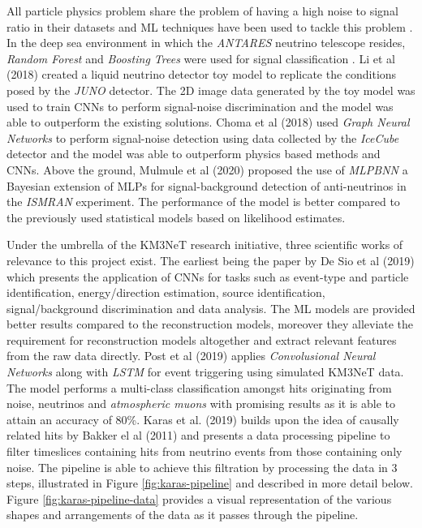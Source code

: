 All particle physics problem share the problem of having a high noise
to signal ratio in their datasets and ML techniques have been used to
tackle this problem \cite{mulmule2020machine, li2018deep,
  choma2018graph, neff2012signal}. In the deep sea environment in
which the \emph{ANTARES} neutrino telescope resides, \emph{Random
Forest} and \emph{Boosting Trees} were used for signal classification
\cite{neff2012signal}. Li et al (2018) created a liquid neutrino
detector toy model to replicate the conditions posed by the
\emph{JUNO} detector. The 2D image data generated by the toy model was
used to train CNNs to perform signal-noise discrimination and the
model was able to outperform the existing solutions. Choma et al
(2018) used \emph{Graph Neural Networks} to perform signal-noise
detection using data collected by the \emph{IceCube} detector and the
model was able to outperform physics based methods and CNNs. Above the
ground, Mulmule et al (2020) proposed the use of \emph{MLPBNN} a
Bayesian extension of MLPs for signal-background detection of
anti-neutrinos in the \emph{ISMRAN} experiment. The performance of the
model is better compared to the previously used statistical models
based on likelihood estimates.

Under the umbrella of the KM3NeT research initiative, three scientific
works of relevance to this project exist. The earliest being the paper
by De Sio et al (2019) which presents the application of CNNs for
tasks such as event-type and particle identification, energy/direction
estimation, source identification, signal/background discrimination
and data analysis. The ML models are provided better results compared
to the reconstruction models, moreover they alleviate the requirement
for reconstruction models altogether and extract relevant features
from the raw data directly. Post et al (2019) applies
\emph{Convolusional Neural Networks} \cite{krizhevsky2012imagenet}
along with \emph{LSTM} \cite{sainath2015convolutional} for event
triggering using simulated KM3NeT data. The model performs a
multi-class classification amongst hits originating from noise,
neutrinos and \emph{atmospheric muons} with promising results as it is
able to attain an accuracy of 80\%. Karas et al. (2019) builds upon
the idea of causally related hits by Bakker el al (2011) and presents
a data processing pipeline to filter timeslices containing hits from
neutrino events from those containing only noise. The pipeline is able
to achieve this filtration by processing the data in 3 steps,
illustrated in Figure \ref{fig:karas-pipeline} and described in more
detail below. Figure \ref{fig:karas-pipeline-data} provides a visual
representation of the various shapes and arrangements of the data as
it passes through the pipeline.


